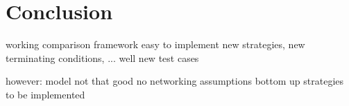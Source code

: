 \chapter{Conclusion}
\label{chap:conclusion}

working comparison framework
easy to implement new strategies, new terminating conditions, ...
well new test cases

however:
model not that good
no networking assumptions
bottom up strategies to be implemented
